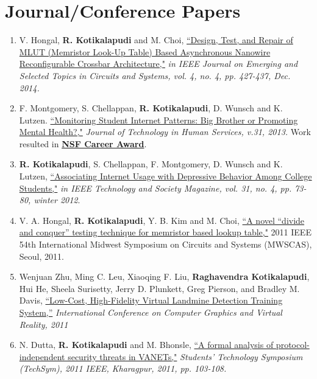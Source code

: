 \documentclass[a4paper,11pt]{article}
\begin{document}
\section{Journal/Conference Papers}
\begin{enumerate}[1)]
    \item V. Hongal, \textbf{R. Kotikalapudi} and M. Choi, \href{http://ieeexplore.ieee.org/stamp/stamp.jsp?tp=&arnumber=6924808&isnumber=6970761}{``Design, Test, and Repair of MLUT (Memristor Look-Up Table) Based Asynchronous Nanowire Reconfigurable Crossbar Architecture,"} \emph{in IEEE Journal on Emerging and Selected Topics in Circuits and Systems, vol. 4, no. 4, pp. 427-437, Dec. 2014.}

    \item F. Montgomery, S. Chellappan,\textbf{ R. Kotikalapudi}, D. Wunsch and K. Lutzen. \href{http://www.tandfonline.com/doi/pdf/10.1080/15228835.2012.756600}{``Monitoring Student Internet Patterns: Big Brother or Promoting Mental Health?,"} \emph{Journal of Technology in Human Services, v.31, 2013.} Work resulted in  \textbf{\href{http://www.nsf.gov/awardsearch/showAward?AWD_ID=1254117}{NSF Career Award}}.

    \item \textbf{R. Kotikalapudi}, S. Chellappan, F. Montgomery, D. Wunsch and K. Lutzen, \href{http://ieeexplore.ieee.org/stamp/stamp.jsp?tp=&arnumber=6387969&isnumber=6387954}{``Associating Internet Usage with Depressive Behavior Among College Students,"} \emph{in IEEE Technology and Society Magazine, vol. 31, no. 4, pp. 73-80, winter 2012}.

    \item V. A. Hongal, \textbf{R. Kotikalapudi}, Y. B. Kim and M. Choi, \href{http://ieeexplore.ieee.org/xpl/articleDetails.jsp?arnumber=6026406}{``A novel ``divide and conquer'' testing technique for memristor based lookup table,"} 2011 IEEE 54th International Midwest Symposium on Circuits and Systems (MWSCAS), Seoul, 2011.  

    \item Wenjuan Zhu, Ming C. Leu, Xiaoqing F. Liu, \textbf{Raghavendra Kotikalapudi}, Hui He, Sheela Surisetty, Jerry D. Plunkett, Greg Pierson, and Bradley M. Davis, \href{http://worldcomp-proceedings.com/proc/p2011/CGV4794.pdf}{``Low-Cost, High-Fidelity Virtual Landmine Detection Training System,''} \emph{International Conference on Computer Graphics and Virtual Reality, 2011}

    \item N. Dutta, \textbf{R. Kotikalapudi} and M. Bhonsle, \href{http://ieeexplore.ieee.org/stamp/stamp.jsp?tp=&arnumber=5783810&isnumber=5783792}{``A formal analysis of protocol-independent security threats in VANETs,"} \emph{Students' Technology Symposium (TechSym), 2011 IEEE, Kharagpur, 2011, pp. 103-108.}


\end{enumerate}
\end{document}
